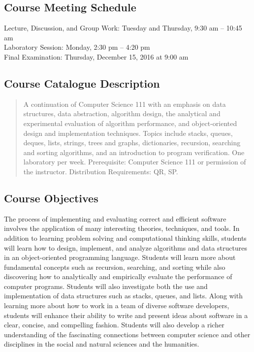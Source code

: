 \subsection*{Course Meeting Schedule}

Lecture, Discussion, and Group Work: Tuesday and Thursday, 9:30 am -- 10:45 am \\
Laboratory Session: Monday, 2:30 pm -- 4:20 pm \\
Final Examination: Thursday, December 15, 2016 at 9:00 am

\subsection*{Course Catalogue Description}

\begin{quote}

  A continuation of Computer Science 111 with an emphasis on data structures, data abstraction, algorithm design, the
  analytical and experimental evaluation of algorithm performance, and object-oriented design and implementation
  techniques. Topics include stacks, queues, deques, lists, strings, trees and graphs, dictionaries, recursion,
  searching and sorting algorithms, and an introduction to program verification. One laboratory per week. Prerequisite:
  Computer Science 111 or permission of the instructor. Distribution Requirements: QR, SP.\@ \\

\end{quote}

\subsection*{Course Objectives}

The process of implementing and evaluating correct and efficient software involves the application of many interesting
theories, techniques, and tools. In addition to learning problem solving and computational thinking skills, students
will learn how to design, implement, and analyze algorithms and data structures in an object-oriented programming
language. Students will learn more about fundamental concepts such as recursion, searching, and sorting while also
discovering how to analytically and empirically evaluate the performance of computer programs. Students will also
investigate both the use and implementation of data structures such as stacks, queues, and lists. Along with learning
more about how to work in a team of diverse software developers, students will enhance their ability to write and
present ideas about software in a clear, concise, and compelling fashion. Students will also develop a richer
understanding of the fascinating connections between computer science and other disciplines in the social and natural
sciences and the humanities.

